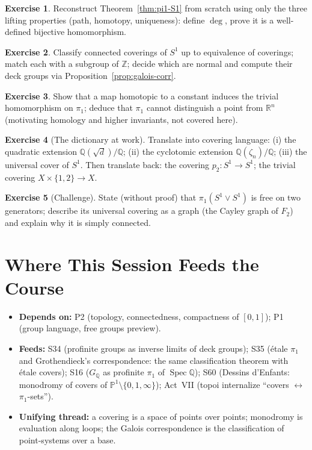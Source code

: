\documentclass[11pt,a4paper]{article}
\theoremstyle{definition}
\newtheorem{exercise}{Exercise}
\newcommand{\Z}{\mathbb{Z}}
\newcommand{\Q}{\mathbb{Q}}
\newcommand{\R}{\mathbb{R}}
\newcommand{\Spec}{\operatorname{Spec}}
\newcommand{\PP}{\mathbb{P}}
\begin{document}
	\begin{exercise}
		Reconstruct Theorem~\ref{thm:pi1-S1} from scratch using only the three lifting properties (path,
		homotopy, uniqueness): define $\deg$, prove it is a well-defined bijective homomorphism.
	\end{exercise}
	\begin{exercise}
		Classify connected coverings of $S^1$ up to equivalence of coverings; match each with a subgroup of
		$\Z$; decide which are normal and compute their deck groups via
		Proposition~\ref{prop:galois-corr}.
	\end{exercise}
	\begin{exercise}
		Show that a map homotopic to a constant induces the trivial homomorphism on $\pi_1$; deduce that
		$\pi_1$ cannot distinguish a point from $\R^n$ (motivating homology and higher invariants, not
		covered here).
	\end{exercise}
	\begin{exercise}[The dictionary at work]
		Translate into covering language: (i) the quadratic extension $\Q(\sqrt d)/\Q$; (ii) the cyclotomic
		extension $\Q(\zeta_n)/\Q$; (iii) the universal cover of $S^1$. Then translate back: the covering
		$p_2:S^1\to S^1$; the trivial covering $X\times\{1,2\}\to X$.
	\end{exercise}
	\begin{exercise}[Challenge]
		State (without proof) that $\pi_1(S^1\vee S^1)$ is free on two generators; describe its universal
		covering as a graph (the Cayley graph of $F_2$) and explain why it is simply connected.
	\end{exercise}
	
	\section*{Where This Session Feeds the Course}
	\begin{itemize}
		\item \textbf{Depends on:} P2 (topology, connectedness, compactness of $[0,1]$); P1 (group language,
		free groups preview).
		\item \textbf{Feeds:} S34 (profinite groups as inverse limits of deck groups); S35 (\'etale $\pi_1$
		and Grothendieck's correspondence: the same classification theorem with \'etale covers);
		S16 ($G_\Q$ as profinite $\pi_1$ of $\Spec\Q$); S60 (Dessins d'Enfants: monodromy of covers of
		$\PP^1\setminus\{0,1,\infty\}$); Act~VII (topoi internalize ``covers $\leftrightarrow$ $\pi_1$-sets'').
		\item \textbf{Unifying thread:} a covering is a space of points over points; monodromy is evaluation
		along loops; the Galois correspondence is the classification of point-systems over a base.
	\end{itemize}
	
\end{document}
